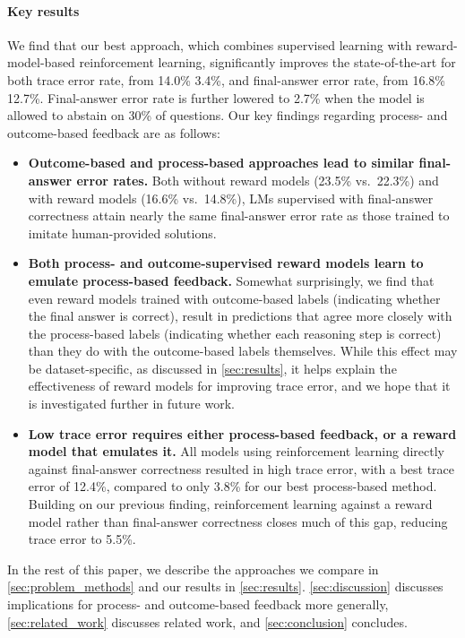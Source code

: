 \documentclass[11pt, a4paper, logo]{deepmind}
\begin{document}
\paragraph{Key results} 
We find that our best approach, which combines supervised learning with reward-model-based reinforcement learning, significantly improves the state-of-the-art for both trace error rate, from 14.0\%  3.4\%, and final-answer error rate, from 16.8\%  12.7\%.
Final-answer error rate is further lowered to 2.7\% when the model is allowed to abstain on 30\% of questions.
Our key findings regarding process- and outcome-based feedback are as follows:
\begin{itemize}[leftmargin=*]
    \item \textbf{Outcome-based and process-based approaches lead to similar final-answer error rates.} Both without reward models (23.5\% vs.\ 22.3\%) and with reward models (16.6\% vs.\ 14.8\%), LMs supervised with final-answer correctness attain nearly the same final-answer error rate as those trained to imitate human-provided solutions.
    \vspace{10pt}
    \item \textbf{Both process- and outcome-supervised reward models learn to emulate process-based feedback.} Somewhat surprisingly, we find that even reward models trained with outcome-based labels (indicating whether the final answer is correct), result in predictions that agree more closely with the process-based labels (indicating whether each reasoning step is correct) than they do with the outcome-based labels themselves. While this effect may be dataset-specific, as discussed in \cref{sec:results}, it helps explain the effectiveness of reward models for improving trace error, and we hope that it is investigated further in future work.
    \vspace{10pt}
    \item \textbf{Low trace error requires either process-based feedback, or a reward model that emulates it.} All models using reinforcement learning directly against final-answer correctness resulted in high trace error, with a best trace error of 12.4\%, compared to only 3.8\% for our best process-based method. Building on our previous finding, reinforcement learning against a reward model rather than final-answer correctness closes much of this gap, reducing trace error to 5.5\%.
\end{itemize}

In the rest of this paper, we describe the approaches we compare in \cref{sec:problem_methods} and our results in \cref{sec:results}. \cref{sec:discussion} discusses implications for process- and outcome-based feedback more generally, \cref{sec:related_work} discusses related work, and \cref{sec:conclusion} concludes.
\end{document}
